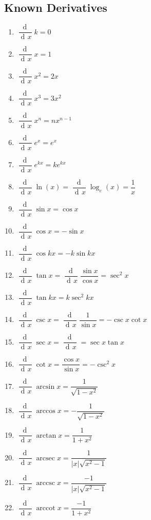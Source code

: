 \documentclass{article}
\DeclareMathOperator{\arcsec}{arcsec}
\DeclareMathOperator{\arccot}{arccot}
\DeclareMathOperator{\arccsc}{arccsc}
\newcommand{\dee}{\mathop{\mathrm{d}\!}}
\begin{document}
\begin{multicols*}{2}
    \section{Known Derivatives}
        \begin{enumerate}
            \item $\dfrac{\dee}{\dee x} k= 0$
            \item $\dfrac{\dee}{\dee x} x= 1$
            \item $\dfrac{\dee}{\dee x} x^2 = 2x$
            \item $\dfrac{\dee}{\dee x} x^3 = 3x^2$
            \item $\dfrac{\dee}{\dee x} x^n = nx^{n-1}$
            \item $\dfrac{\dee}{\dee x} e^x = e^x$
            \item $\dfrac{\dee}{\dee x} e^{kx} = ke^{kx}$
            \item $\dfrac{\dee}{\dee x} \ln(x) = \dfrac{\dee}{\dee x} \log_e(x) = \dfrac{1}{x}$
            \item $\dfrac{\dee}{\dee x} \sin x = \cos x$
            \item $\dfrac{\dee}{\dee x} \cos x = -\sin x$
            \item $\dfrac{\dee}{\dee x} \cos k x = -k \sin kx$
            \item $\dfrac{\dee}{\dee x} \tan x = \dfrac{\dee}{\dee x} \dfrac{\sin x}{\cos x} =\sec^2 x $
            \item $\dfrac{\dee}{\dee x} \tan kx = k\sec^2kx$
            \item $\dfrac{\dee}{\dee x} \csc x = \dfrac{\dee}{\dee x} \dfrac{1}{\sin x} = - \csc x \cot x$
            \item $\dfrac{\dee}{\dee x} \sec x = \dfrac{\dee}{\dee x} = \sec x \tan x$
            \item $\dfrac{\dee}{\dee x} \cot x = \dfrac{\cos x}{\sin x} = - \csc^2 x$
            \item $\dfrac{\dee}{\dee x} \arcsin x = \dfrac{1}{\sqrt{1-x^2}}$
            \item $\dfrac{\dee}{\dee x} \arccos x = -\dfrac{1}{\sqrt{1-x^2}}$
            \item $\dfrac{\dee}{\dee x} \arctan x = \dfrac{1}{1+x^2}$
            \item $\dfrac{\dee}{\dee x} \arcsec x = \dfrac{1}{|x|\sqrt{x^2-1}}$
            \item $\dfrac{\dee}{\dee x} \arccsc x = \dfrac{-1}{|x|\sqrt{x^2-1}}$
            \item $\dfrac{\dee}{\dee x} \arccot x = \dfrac{-1}{1+x^2}$
        \end{enumerate}
    \newcolumn

\end{multicols*}
\end{document}
